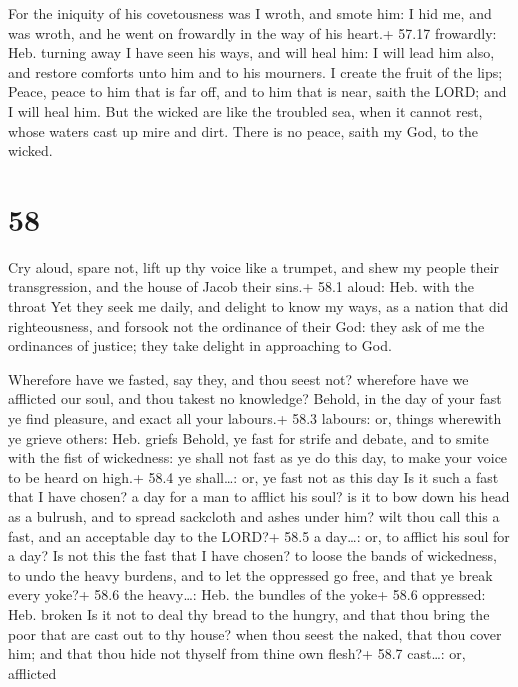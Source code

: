  For the iniquity of his covetousness was I wroth, and
smote him: I hid me, and was wroth, and he went on frowardly in the way
of his heart.+ 57.17 frowardly: Heb. turning away  I have
seen his ways, and will heal him: I will lead him also, and restore
comforts unto him and to his mourners.  I create the fruit
of the lips; Peace, peace to him that is far off, and to him that is
near, saith the LORD; and I will heal him.  But the wicked
are like the troubled sea, when it cannot rest, whose waters cast up
mire and dirt.  There is no peace, saith my God, to the
wicked.

\hypertarget{section-57}{%
\section{58}\label{section-57}}

 Cry aloud, spare not, lift up thy voice like a trumpet, and
shew my people their transgression, and the house of Jacob their sins.+
58.1 aloud: Heb. with the throat  Yet they seek me daily,
and delight to know my ways, as a nation that did righteousness, and
forsook not the ordinance of their God: they ask of me the ordinances of
justice; they take delight in approaching to God.

 Wherefore have we fasted, say they, and thou seest not?
wherefore have we afflicted our soul, and thou takest no knowledge?
Behold, in the day of your fast ye find pleasure, and exact all your
labours.+ 58.3 labours: or, things wherewith ye grieve others: Heb.
griefs  Behold, ye fast for strife and debate, and to smite
with the fist of wickedness: ye shall not fast as ye do this day, to
make your voice to be heard on high.+ 58.4 ye shall\ldots: or, ye fast
not as this day  Is it such a fast that I have chosen? a day
for a man to afflict his soul? is it to bow down his head as a bulrush,
and to spread sackcloth and ashes under him? wilt thou call this a fast,
and an acceptable day to the LORD?+ 58.5 a day\ldots: or, to afflict his
soul for a day?  Is not this the fast that I have chosen? to
loose the bands of wickedness, to undo the heavy burdens, and to let the
oppressed go free, and that ye break every yoke?+ 58.6 the heavy\ldots:
Heb. the bundles of the yoke+ 58.6 oppressed: Heb. broken 
Is it not to deal thy bread to the hungry, and that thou bring the poor
that are cast out to thy house? when thou seest the naked, that thou
cover him; and that thou hide not thyself from thine own flesh?+ 58.7
cast\ldots: or, afflicted

